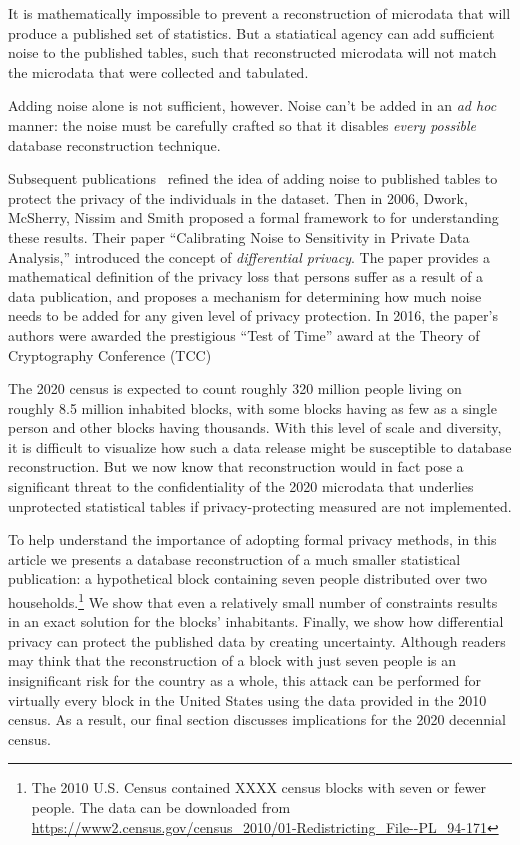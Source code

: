 \documentclass[runningheads]{llncs}
\begin{document}
It is mathematically impossible to prevent a reconstruction of
microdata that will produce a published set of statistics. But a
statiatical agency can add sufficient noise to the published tables, such that
reconstructed microdata will not match the microdata that were
collected and tabulated. 

Adding noise alone is not sufficient, however. Noise can't be added in an \emph{ad
  hoc} manner: the noise must be carefully crafted so that it disables
\emph{every possible} database reconstruction technique. 

Subsequent
publications~\cite{privacy-preserving-datamining-on-vertically-partitioned-databases,BDMN05}
refined the idea of adding noise to published tables to protect the
privacy of the individuals in the dataset. Then in 2006, Dwork, McSherry, Nissim and Smith proposed a formal framework
to for understanding these results. Their paper ``Calibrating Noise to Sensitivity in Private Data
Analysis,''\cite{Dwork:2006:CNS:2180286.2180305} 
introduced the concept of \emph{differential privacy}. The paper
provides a mathematical definition of the privacy loss that
persons suffer as a result of a data publication, and proposes a
mechanism for determining how much noise needs to be added for any
given level of privacy protection. In 2016, the paper's authors were awarded the
prestigious ``Test of Time'' award at the Theory of Cryptography
Conference (TCC)

The 2020 census is expected to count roughly 320 million people living
on roughly 8.5 million inhabited blocks, with some blocks having as
few as a single person and other blocks having thousands. With this
level of scale and diversity, it is difficult to visualize how such a
data release might be susceptible to database reconstruction. But we
now know that reconstruction would in fact pose a significant threat
to the confidentiality of the 2020 microdata that underlies
unprotected statistical tables if privacy-protecting measured are not
implemented. 

To help understand the importance of adopting formal privacy methods, in
this article we presents a database reconstruction of a much
smaller statistical publication: a hypothetical block containing seven
people distributed over two households.\footnote{The 2010 U.S. Census contained XXXX census blocks with seven or fewer people. The data can be downloaded from \url{https://www2.census.gov/census_2010/01-Redistricting_File--PL_94-171}} We show that even a relatively
small number of constraints results in an exact solution for the blocks'
inhabitants. Finally, we show how differential privacy can protect the
published data by creating uncertainty. Although readers may think
that the reconstruction of a block with just seven people is an
insignificant risk for the country as a whole, this attack can be
performed for virtually every block in the United States using the
data provided in the 2010 census. As a result, our final section discusses
implications for the 2020 decennial census.
\end{document}
